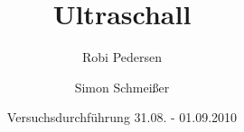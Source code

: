 \documentclass[a4paper,oneside]{scrartcl} %
\title{Ultraschall}
\author{Robi Pedersen \and Simon Schmeißer}
\date{Versuchsdurchführung 31.08. - 01.09.2010}
\begin{document}
\begin{titlepage}
  \maketitle
  \vfill
  \thispagestyle{empty}
\end{titlepage}

\tableofcontents
\clearpage









\clearpage

 

\end{document}
